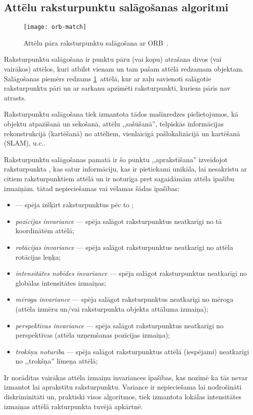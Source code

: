 \subsection{Attēlu raksturpunktu salāgošanas algoritmi} \label{sec:matching}
\begin{figure}[tbh]
	\centering
	\texttt{[image: orb-match]}
	\caption{Attēlu pāra raksturpunktu salāgošana ar ORB~\cite{ORB}.}
	\label{fig:orb}
\end{figure}

Raksturpunktu salāgošana ir punktu pāru (vai kopu) atrašana divos
(vai vairākos) attēlos, kuri atbilst vienam un tam pašam attēlā redzamam
objektam. Salāgošanas piemērs redzams \ref{fig:orb}~attēlā, kur ar zaļu
savienoti salāgotie raksturpunktu pāri un ar sarkanu apzīmēti raksturpunkti,
kuriem pāris nav atrasts.

Raksturpunktu salāgošana tiek izmantota tādos mašīnredzes pielietojumos, kā
objektu atpazīšanā un sekošanā, attēlu ,,sašūšanā'', 
telpiskās informācijas rekonstrukcijā (kartēšanā) no attēliem,
vienlaicīgā pašlokalizācijā un kartēšanā (SLAM), u.c..

Raksturpunktu salāgošanas pamatā ir šo punktu ,,aprakstīšana'' izveidojot
raksturpunkta , kas satur informāciju,
kas ir pietiekami unikāla, lai nesakristu ar citiem raksturpunktiem attēlā
un ir noturīga pret sagaidāmām attēla īpašību izmaiņām.
 tātad nepieciešamas vai vēlamas šādas īpašības:
\begin{itemize}
	\item {} --- spēja izšķirt raksturpunktus
		pēc to ;
	\item \emph{pozīcijas invariance} --- spēja salāgot raksturpunktus
		neatkarīgi no tā koordinātēm attēlā;
	\item \emph{rotācijas invariance} --- spēja salāgot raksturpunktus
		neatkarīgi no attēla rotācijas leņķa;
	\item \emph{intensitātes nobīdes invariance} --- spēja salāgot raksturpunktus
		neatkarīgi no globālas intensitātes izmaiņas;
	\item \emph{mēroga invariance} --- spēja salāgot raksturpunktus
		neatkarīgi no mēroga (attēla izmēru un/vai raksturpunkta objekta attāluma izmaiņa);
	\item \emph{perspektīvas invariance} --- spēja salāgot raksturpunktus
		neatkarīgi no perspektīvas (attēla uzņemšanas pozīcijas izmaiņa);
	\item \emph{trokšņu noturība} --- spēja salāgot raksturpunktus
		attēlā (iespējami) neatkarīgi no ,,trokšņa'' līmeņa attēlā;
\end{itemize}
Ir norādītas vairākas attēla izmaiņu invariances īpašības,
kas nozīmē ka tās nevar izmantot lai aprakstītu raksturpunktu.
Variance ir nepieciešama lai nodrošināti diskriminitāti un, praktiski visos
algoritmos, tiek izmantota lokālas intensitātes izmaiņas attēlā 
rakturpunkta tuvējā apkārtnē.

